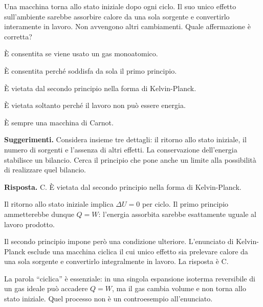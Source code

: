 \documentclass[11pt,a4paper]{article}
\begin{document}
\newpage
\begin{samepage}
\par\smallskip
Una macchina torna allo stato iniziale dopo ogni ciclo. Il suo unico effetto sull’ambiente sarebbe assorbire calore da una sola sorgente e convertirlo interamente in lavoro. Non avvengono altri cambiamenti. Quale affermazione è corretta?\par


\begin{list}{}{\setlength{\leftmargin}{1.4em}\setlength{\itemsep}{.1em}\setlength{\parsep}{0pt}}\small
\item[A.] È consentita se viene usato un gas monoatomico.
\item[B.] È consentita perché soddisfa da sola il primo principio.
\item[C.] È vietata dal secondo principio nella forma di Kelvin-Planck.
\item[D.] È vietata soltanto perché il lavoro non può essere energia.
\item[E.] È sempre una macchina di Carnot.
\end{list}
{\small\textbf{Suggerimenti.} Considera insieme tre dettagli: il ritorno allo stato iniziale, il numero di sorgenti e l’assenza di altri effetti. La conservazione dell’energia stabilisce un bilancio. Cerca il principio che pone anche un limite alla possibilità di realizzare quel bilancio.\par}
\medskip\noindent\textbf{Risposta.} C. È vietata dal secondo principio nella forma di Kelvin-Planck.\par


Il ritorno allo stato iniziale implica \(\Delta U=0\) per ciclo. Il primo principio ammetterebbe dunque \(Q=W\): l’energia assorbita sarebbe esattamente uguale al lavoro prodotto.\par

Il secondo principio impone però una condizione ulteriore. L’enunciato di Kelvin-Planck esclude una macchina ciclica il cui unico effetto sia prelevare calore da una sola sorgente e convertirlo integralmente in lavoro. La risposta è C.\par

La parola “ciclica” è essenziale: in una singola espansione isoterma reversibile di un gas ideale può accadere \(Q=W\), ma il gas cambia volume e non torna allo stato iniziale. Quel processo non è un controesempio all’enunciato.\par

\end{samepage}
\end{document}
